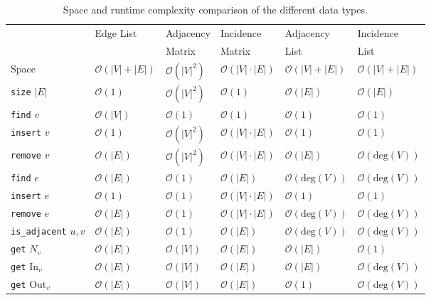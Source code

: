              \begin{table}[htp]
            \begin{center}
                \begin{tabular}[c]{l l l l l l} \toprule
                \multirow{2}{*}{} & Edge List & Adjacency & Incidence & Adjacency  & Incidence \\ 
                & &  Matrix & Matrix & List & List \\ \midrule
                Space & $\mathcal{O}(|V| + |E|)$ & $\mathcal{O}(|V|^2)$ & $\mathcal{O}(|V| \cdot |E|)$ & $\mathcal{O}(|V| + |E|)$ & $\mathcal{O}(|V| + |E|)$ \\
                \texttt{size} $|E|$ & $\mathcal{O}(1)$ & $\mathcal{O}(|V|^2)$ & $\mathcal{O}(1)$ & $\mathcal{O}(|E|)$ & $\mathcal{O}(|E|)$ \\
                \texttt{find} $v$ & $\mathcal{O}(|V|)$ & $\mathcal{O}(1)$ & $\mathcal{O}(1)$ & $\mathcal{O}(1)$ & $\mathcal{O}(1)$ \\
                \texttt{insert} $v$ & $\mathcal{O}(1)$ & $\mathcal{O}(|V|^2)$ & $\mathcal{O}(|V| \cdot |E|)$ & $\mathcal{O}(1)$ & $\mathcal{O}(1)$ \\
                \texttt{remove} $v$ & $\mathcal{O}(|E|)$ & $\mathcal{O}(|V|^2)$ & $\mathcal{O}(|V| \cdot |E|)$ & $\mathcal{O}(|E|)$ & $\mathcal{O}(\text{deg}(V))$ \\
                \texttt{find} $e$ & $\mathcal{O}(|E|)$ & $\mathcal{O}(1)$ & $\mathcal{O}(|E|)$ & $\mathcal{O}(\text{deg}(V))$ & $\mathcal{O}(\text{deg}(V))$ \\
                \texttt{insert} $e$ & $\mathcal{O}(1)$ & $\mathcal{O}(1)$ & $\mathcal{O}(|V| \cdot |E|)$ & $\mathcal{O}(1)$ & $\mathcal{O}(1)$ \\
                \texttt{remove} $e$ & $\mathcal{O}(|E|)$ & $\mathcal{O}(1)$ & $\mathcal{O}(|V| \cdot |E|)$ & $\mathcal{O}(\text{deg}(V))$ & $\mathcal{O}(\text{deg}(V))$ \\
                \texttt{is_adjacent} $u, v$ & $\mathcal{O}(|E|)$ & $\mathcal{O}(1)$ & $\mathcal{O}(|E|)$ & $\mathcal{O}(\text{deg}(V))$ & $\mathcal{O}(\text{deg}(V))$ \\
                \texttt{get} $N_v$ & $\mathcal{O}(|E|)$ & $\mathcal{O}(|V|)$ & $\mathcal{O}(|E|)$ & $\mathcal{O}(|E|)$ & $\mathcal{O}(1)$ \\
                \texttt{get} $\text{In}_v$ & $\mathcal{O}(|E|)$ & $\mathcal{O}(|V|)$ & $\mathcal{O}(|E|)$ & $\mathcal{O}(|E|)$ & $\mathcal{O}(\text{deg}(V))$ \\
                \texttt{get} $\text{Out}_v$ & $\mathcal{O}(|E|)$ & $\mathcal{O}(|V|)$ & $\mathcal{O}(|E|)$ & $\mathcal{O}(1)$ & $\mathcal{O}(\text{deg}(V))$ \\ \bottomrule
            \end{tabular}
            \end{center}
            \caption{Space and runtime complexity comparison of the different data types.}
            \label{sumtabds}
            \end{table}
            
